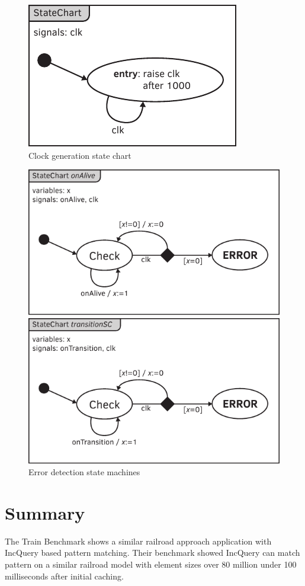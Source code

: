 \begin{figure}[h]
	\centering
	\includegraphics[width=0.3\linewidth]{include/figures/chapter_6/statecharts/clock}
	\caption{Clock generation state chart}
	\label{fig:case_study:fov}
\end{figure}


\begin{figure}[h]
	\centering
	\begin{minipage}{0.49\linewidth}
		\includegraphics[width=0.9\linewidth]{include/figures/chapter_6/statecharts/onalive}
	\end{minipage}
	\begin{minipage}{0.49\linewidth}
		\includegraphics[width=0.9\linewidth]{include/figures/chapter_6/statecharts/ontransition}
	\end{minipage}
	\caption{Error detection state machines}
	\label{fig:case_study:}
\end{figure}


\section{Summary}

The Train Benchmark\cite{TrainBenchmark} shows a similar railroad approach application with IncQuery based pattern matching. Their benchmark showed IncQuery can match pattern on a similar railroad model with element sizes over 80 million under 100 milliseconds after initial caching.